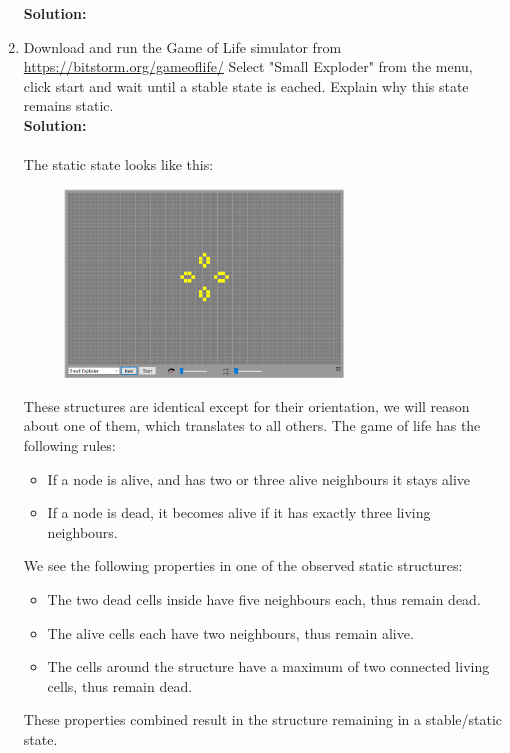 \documentclass[a4paper]{article}
\begin{document}
\begin{enumerate}
	
	
	\textbf{Solution:}\\
	
	
	
	
	
	\item Download and run the Game of Life simulator from \url{https://bitstorm.org/gameoflife/} Select "Small Exploder" from the menu, click start and wait until a stable state is eached. Explain why this state remains static.\\
	\textbf{Solution:}\\\\
	The static state looks like this:
	\begin{figure}[H]
	\centering
  	\includegraphics[width=0.7\textwidth]{images/ex_5_small_exploder.png}
	\end{figure}
	
	These structures are identical except for their orientation, we will reason about one of them, which translates to all others. The game of life has the following rules:
	\begin{itemize}
	    \item If a node is alive, and has two or three alive neighbours it stays alive
	    \item If a node is dead, it becomes alive if it has exactly three living neighbours.
	\end{itemize}
	
	We see the following properties in one of the observed static structures:
	\begin{itemize}
	    \item The two dead cells inside have five neighbours each, thus remain dead.
	    \item The alive cells each have two neighbours, thus remain alive.
	    \item The cells around the structure have a maximum of two connected living cells, thus remain dead.
	\end{itemize}
	These properties combined result in the structure remaining in a stable/static state.
	
\end{enumerate}
\end{document}
